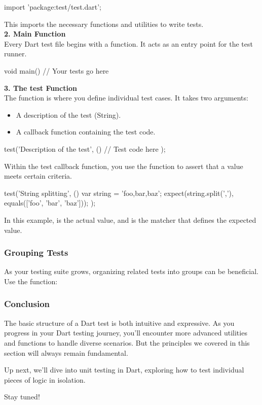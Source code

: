 \begin{dartcode}
import 'package:test/test.dart';
\end{dartcode}

This imports the necessary functions and utilities to write tests.\\[1em]
\large{\textbf{2. Main Function}}\\
Every Dart test file begins with a  function. It acts as an entry point for the test runner.
\begin{dartcode}
void main() {
  // Your tests go here
}
\end{dartcode}
\large{\textbf{3. The test Function}}\\
The  function is where you define individual test cases. It takes two arguments:

\begin{itemize}
    \item A description of the test (String).
    \item A callback function containing the test code.
\end{itemize}

\begin{dartcode}
test('Description of the test', () {
  // Test code here
});
\end{dartcode}

Within the test callback function, you use the  function to assert that a value meets certain criteria.
\begin{dartcode}
test('String splitting', () {
  var string = 'foo,bar,baz';
  expect(string.split(','), equals(['foo', 'bar', 'baz']));
});
\end{dartcode}
In this example,  is the actual value, and  is the matcher that defines the expected value.

\subsubsection*{Grouping Tests}
As your testing suite grows, organizing related tests into groups can be beneficial. Use the  function:
\begin{dartcode}
group('String tests', () {
  test('String splitting', () {
    var string = 'foo,bar,baz';
    expect(string.split(','), equals(['foo', 'bar', 'baz']));
});

  // Other string-related tests
\end{dartcode}

\subsubsection*{Conclusion}
The basic structure of a Dart test is both intuitive and expressive. As you progress in your Dart testing journey, you'll encounter more advanced utilities and functions to handle diverse scenarios. But the principles we covered in this section will always remain fundamental.

Up next, we'll dive into unit testing in Dart, exploring how to test individual pieces of logic in isolation.

Stay tuned!

